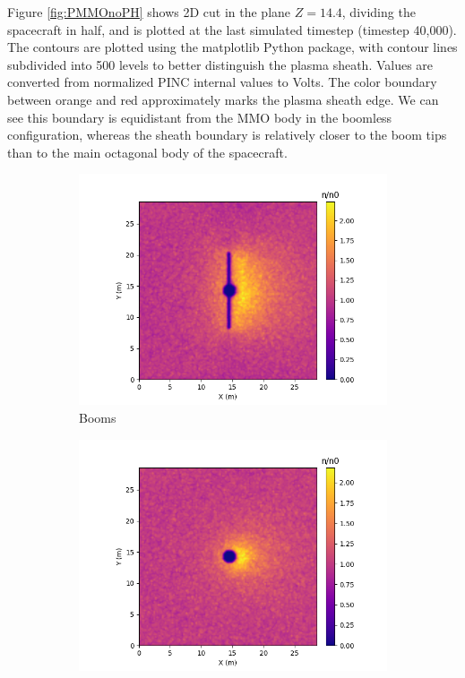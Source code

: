 Figure \ref{fig:PMMOnoPH} shows 2D cut in the plane $Z=14.4$, dividing the spacecraft in half, and is plotted at the last simulated timestep (timestep 40,000). The contours are plotted using the matplotlib Python package, with contour lines subdivided into 500 levels to better distinguish the plasma sheath. Values are converted from normalized PINC internal values to Volts. The color boundary between orange and red approximately marks the plasma sheath edge. We can see this boundary is equidistant from the MMO body in the boomless configuration, whereas the sheath boundary is relatively closer to the boom tips than to the main octagonal body of the spacecraft. 

\begin{center}
    \begin{figure}[H]
      \begin{subfigure}[b]{0.61\textwidth}
      \includegraphics[width=\textwidth]{figures/MMO/noPH/WB/I_noPH_WB.png}
      \caption{Booms}
      \label{fig:I_noPH_WB}
    \end{subfigure}
    \begin{subfigure}[b]{0.61\textwidth}
      \includegraphics[width=\textwidth]{figures/MMO/noPH/NB/I_noPH_NB.png}

\end{subfigure}
\end{figure}
\end{center}
